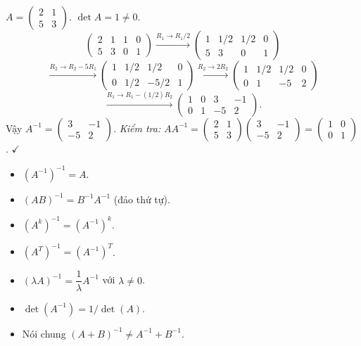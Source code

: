 \documentclass[12pt,a4paper]{article}
\begin{document}
\begin{vidu}[title={Tính $A^{-1}$ bằng Gauss-Jordan}]
$A = \begin{pmatrix}2 & 1\\ 5 & 3\end{pmatrix}$. $\det A = 1 \ne 0$.
\[
  \left(\begin{array}{cc|cc}2 & 1 & 1 & 0\\ 5 & 3 & 0 & 1\end{array}\right) \xrightarrow{R_1 \to R_1/2}
  \left(\begin{array}{cc|cc}1 & 1/2 & 1/2 & 0\\ 5 & 3 & 0 & 1\end{array}\right)
\]
\[
  \xrightarrow{R_2 \to R_2 - 5R_1}
  \left(\begin{array}{cc|cc}1 & 1/2 & 1/2 & 0\\ 0 & 1/2 & -5/2 & 1\end{array}\right)
  \xrightarrow{R_2 \to 2R_2}
  \left(\begin{array}{cc|cc}1 & 1/2 & 1/2 & 0\\ 0 & 1 & -5 & 2\end{array}\right)
\]
\[
  \xrightarrow{R_1 \to R_1 - (1/2)R_2}
  \left(\begin{array}{cc|cc}1 & 0 & 3 & -1\\ 0 & 1 & -5 & 2\end{array}\right).
\]
Vậy $A^{-1} = \begin{pmatrix}3 & -1\\ -5 & 2\end{pmatrix}$. \emph{Kiểm tra:} $AA^{-1} = \begin{pmatrix}2 & 1\\ 5 & 3\end{pmatrix}\begin{pmatrix}3 & -1\\ -5 & 2\end{pmatrix} = \begin{pmatrix}1 & 0\\ 0 & 1\end{pmatrix}$. $\checkmark$
\end{vidu}

\begin{tinhchat}[title={Tính chất nghịch đảo}]
\begin{itemize}
  \item $(A^{-1})^{-1} = A$.
  \item $(AB)^{-1} = B^{-1}A^{-1}$ \quad (đảo thứ tự).
  \item $(A^k)^{-1} = (A^{-1})^k$.
  \item $(A^T)^{-1} = (A^{-1})^T$.
  \item $(\lambda A)^{-1} = \dfrac{1}{\lambda} A^{-1}$ với $\lambda \ne 0$.
  \item $\det(A^{-1}) = 1/\det(A)$.
  \item Nói chung $(A + B)^{-1} \ne A^{-1} + B^{-1}$.
\end{itemize}
\end{tinhchat}
\end{document}
